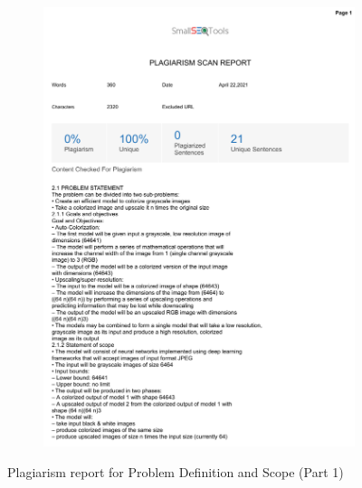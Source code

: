\documentclass[oneside,a4paper,12pt]{report}
\begin{document}
\begin{appendices}
\begin{figure}
	\begin{subfigure}[H]{\textwidth}
		\centering
    	\includegraphics[scale=0.7, page=1]{plagiarism/problem_definition&scope_1.pdf}
    \end{subfigure}
 \caption{Plagiarism report for Problem Definition and Scope (Part 1)}
    \label{PlagiarismPDS1}
\end{figure}
\begin{figure}\ContinuedFloat
    \begin{subfigure}[H]{\textwidth}
    	\centering

\end{subfigure}
\end{figure}
\end{appendices}
\end{document}
